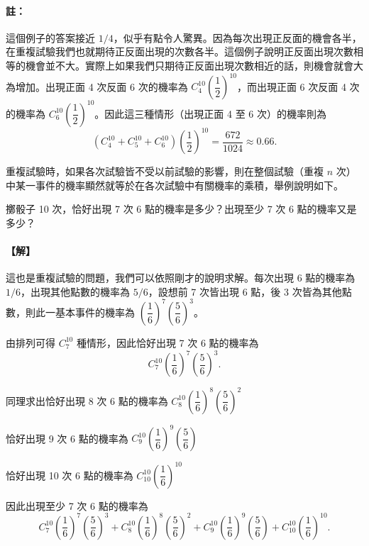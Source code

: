 \vspace{0.8em}
\paragraph{註：}
這個例子的答案接近 $1/4$，似乎有點令人驚異。因為每次出現正反面的機會各半，在重複試驗我們也就期待正反面出現的次數各半。這個例子說明正反面出現次數相等的機會並不大。實際上如果我們只期待正反面出現次數相近的話，則機會就會大為增加。出現正面 4 次反面 6 次的機率為 $C_4^{10}\left(\dfrac{1}{2}\right)^{10}$，而出現正面 6 次反面 4 次的機率為 $C_6^{10}\left(\dfrac{1}{2}\right)^{10}$。因此這三種情形（出現正面 4 至 6 次）的機率則為
\[
(C_4^{10} + C_5^{10} + C_6^{10})\left(\frac{1}{2}\right)^{10} = \frac{672}{1024} \approx 0.66.
\]

重複試驗時，如果各次試驗皆不受以前試驗的影響，則在整個試驗（重複 $n$ 次）中某一事件的機率顯然就等於在各次試驗中有關機率的乘積，舉例說明如下。

\vspace{1em}
\begin{discussion}\label{disc:b5s-3-6}
擲骰子 10 次，恰好出現 7 次 6 點的機率是多少？出現至少 7 次 6 點的機率又是多少？
\end{discussion}
\paragraph{【解】}
這也是重複試驗的問題，我們可以依照剛才的說明求解。每次出現 6 點的機率為 $1/6$，出現其他點數的機率為 $5/6$，設想前 7 次皆出現 6 點，後 3 次皆為其他點數，則此一基本事件的機率為 $\left(\dfrac{1}{6}\right)^7 \left(\dfrac{5}{6}\right)^3$。

由排列可得 $C_7^{10}$ 種情形，因此恰好出現 7 次 6 點的機率為
\[
C_7^{10} \left(\frac{1}{6}\right)^7 \left(\frac{5}{6}\right)^3.
\]

\indent 同理求出恰好出現 8 次 6 點的機率為 $C_8^{10} \left(\dfrac{1}{6}\right)^8 \left(\dfrac{5}{6}\right)^2$

\indent 恰好出現 9 次 6 點的機率為 $C_9^{10} \left(\dfrac{1}{6}\right)^9 \left(\dfrac{5}{6}\right)$

\indent 恰好出現 10 次 6 點的機率為 $C_{10}^{10} \left(\dfrac{1}{6}\right)^{10}$

因此出現至少 7 次 6 點的機率為
\[
C_7^{10} \left(\frac{1}{6}\right)^7 \left(\frac{5}{6}\right)^3 + C_8^{10} \left(\frac{1}{6}\right)^8 \left(\frac{5}{6}\right)^2 + C_9^{10} \left(\frac{1}{6}\right)^9 \left(\frac{5}{6}\right) + C_{10}^{10} \left(\frac{1}{6}\right)^{10}.
\]


